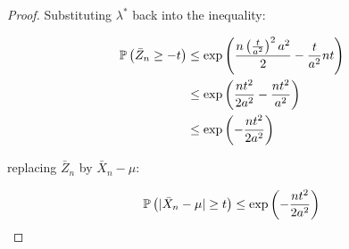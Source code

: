 \begin{proof}
    Substituting $\lambda^*$ back into the inequality:
    
    \begin{align*}
    \mathbb{P}\left(\bar{Z}_n \geq -t\right) &\leq
        \exp\left(\frac{n\left(\frac{t}{a^2}\right)^2a^2}{2} - \frac{t}{a^2} n t \right)\\
    &\leq
        \exp\left(\frac{nt^2}{2a^2} - \frac{nt^2}{a^2} \right)\\
    &\leq
        \exp\left(-\frac{nt^2}{2a^2} \right)\\
    \end{align*}
    
    replacing $\bar{Z}_n$ by $\bar{X}_n - \mu$:
    
    \begin{align*}
    \mathbb{P}\left(|\bar{X}_n - \mu| \geq t\right) \leq \exp\left(-\frac{nt^2}{2 a^2}\right)
    \end{align*}
    
    \end{proof}